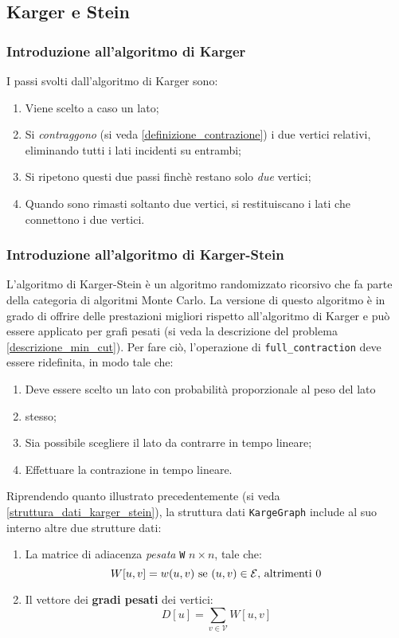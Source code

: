 \subsection{Karger e Stein}
\label{karger_stein_section}

\subsubsection{Introduzione all'algoritmo di Karger}
I passi svolti dall'algoritmo di Karger sono:
\begin{enumerate}
    \item Viene scelto a caso un lato;
    \item Si \textit{contraggono} (si veda \ref{definizione_contrazione}) i due vertici 
    relativi, eliminando tutti i lati incidenti su entrambi;
    \item Si ripetono questi due passi finchè restano solo \textit{due} vertici;
    \item Quando sono rimasti soltanto due vertici, si restituiscano i lati che  
    connettono i due vertici.
\end{enumerate}

\subsubsection{Introduzione all'algoritmo di Karger-Stein}
L'algoritmo di Karger-Stein è un algoritmo randomizzato ricorsivo che fa parte della 
categoria di algoritmi Monte Carlo. La versione di questo algoritmo è in grado di 
offrire delle prestazioni migliori rispetto all'algoritmo di Karger e può essere 
applicato per grafi pesati (si veda la descrizione del problema 
\ref{descrizione_min_cut}). Per fare ciò, l'operazione di \verb|full_contraction| 
deve essere ridefinita, in modo tale che:
\begin{enumerate}
    \item Deve essere scelto un lato con probabilità proporzionale al peso del lato 
    \item stesso;
    \item Sia possibile scegliere il lato da contrarre in tempo lineare;
    \item Effettuare la contrazione in tempo lineare.
\end{enumerate}

Riprendendo quanto illustrato precedentemente (si veda 
\ref{struttura_dati_karger_stein}), la struttura dati \verb|KargeGraph| 
include al suo interno altre due strutture dati:
\begin{enumerate}
    \item La matrice di adiacenza \textit{pesata} \verb|W|
    $n \times n$, tale che: 
    \[
        W[u,v] = w(u,v) \textnormal{ se } (u,v) \in \mathcal{E} 
        \textnormal{, altrimenti } 0
    \]
    \item Il vettore dei \textbf{gradi pesati} dei vertici:
    \[
        D[u] = \sum_{v \in \mathcal{V}} W[u,v]
    \]
\end{enumerate}

